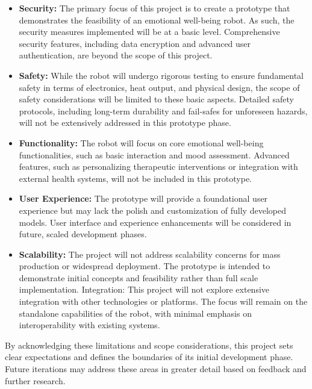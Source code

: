 \begin{itemize}
    \item \textbf{Security:} The primary focus of this project is to create a prototype that demonstrates the feasibility of an emotional well-being robot. As such, the security measures implemented will be at a basic level. Comprehensive security features, including data encryption and advanced user authentication, are beyond the scope of this project.
    \item \textbf{Safety:} While the robot will undergo rigorous testing to ensure fundamental safety in terms of electronics, heat output, and physical design, the scope of safety considerations will be limited to these basic aspects. Detailed safety protocols, including long-term durability and fail-safes for unforeseen hazards, will not be extensively addressed in this prototype phase.
    \item \textbf{Functionality:} The robot will focus on core emotional well-being functionalities, such as basic interaction and mood assessment. Advanced features, such as personalizing therapeutic interventions or integration with external health systems, will not be included in this prototype.
    \item \textbf{User Experience:} The prototype will provide a foundational user experience but may lack the polish and customization of fully developed models. User interface and experience enhancements will be considered in future, scaled development phases.
    \item \textbf{Scalability:} The project will not address scalability concerns for mass production or widespread deployment. The prototype is intended to demonstrate initial concepts and feasibility rather than full scale implementation.
    Integration: This project will not explore extensive integration with other technologies or platforms. The focus will remain on the standalone capabilities of the robot, with minimal emphasis on interoperability with existing systems.
    
\end{itemize}

By acknowledging these limitations and scope considerations, this project sets clear expectations and defines the boundaries of its initial development phase. Future iterations may address these areas in greater detail based on feedback and further research.

